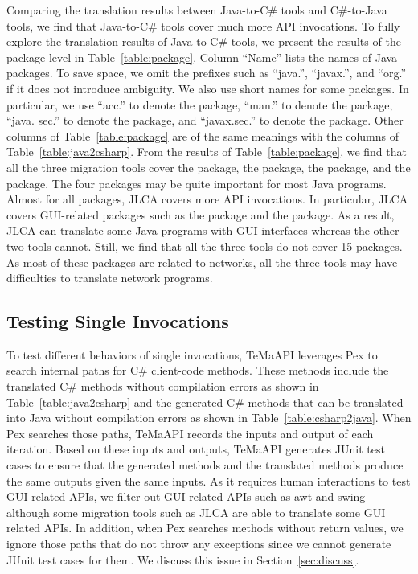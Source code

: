 Comparing the translation results between Java-to-C\# tools and C\#-to-Java tools, we find that Java-to-C\# tools cover much more API invocations. To fully explore the translation results of Java-to-C\# tools, we present the results of the package level in Table~\ref{table:package}. Column ``Name'' lists the names of Java packages. To save space, we omit the prefixes such as ``java.'', ``javax.'', and ``org.'' if it does not introduce ambiguity. We also use short names for some packages. In particular, we use ``acc.'' to denote the  package, ``man.'' to denote the  package, ``java. sec.'' to denote the  package, and ``javax.sec.'' to denote the  package. Other columns of Table~\ref{table:package} are of the same meanings with the columns of Table~\ref{table:java2csharp}. From the results of Table~\ref{table:package}, we find that all the three migration tools cover the  package, the  package, the  package, and the  package. The four packages may be quite important for most Java programs. Almost for all packages, JLCA covers more API invocations. In particular, JLCA covers GUI-related packages such as the  package and the  package. As a result, JLCA can translate some Java programs with GUI interfaces whereas the other two tools cannot. Still, we find that all the three tools do not cover 15 packages. As most of these packages are related to networks, all the three tools may have difficulties to translate network programs.

\subsection{Testing Single Invocations}
\label{sec:evaluation:single}


To test different behaviors of single invocations, TeMaAPI leverages Pex to search internal paths for C\# client-code methods. These methods include the translated C\# methods without compilation errors as shown in Table~\ref{table:java2csharp} and the generated C\# methods that can be translated into Java without compilation errors as shown in Table~\ref{table:csharp2java}. When Pex searches those paths, TeMaAPI records the inputs and output of each iteration. Based on these inputs and outputs, TeMaAPI generates JUnit test cases to ensure that the generated methods and the translated methods produce the same outputs given the same inputs. As it requires human interactions to test GUI related APIs, we filter out GUI related APIs such as awt and swing although some migration tools such as JLCA are able to translate some GUI related APIs. In addition, when Pex searches methods without return values, we ignore those paths that do not throw any exceptions since we cannot generate JUnit test cases for them. We discuss this issue in Section~\ref{sec:discuss}.


